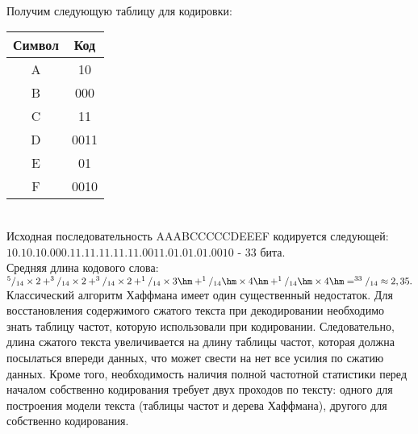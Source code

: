 \\
\\
\\Получим следующую таблицу для кодировки:
\begin{table}[h]
\begin{tabular}{|c|c|}
\hline
Символ &  Код \\
\hline
A & 10 \\
B & 000 \\
C & 11 \\
D & 0011 \\
E & 01 \\
F & 0010 \\
\hline
\end{tabular}
\end{table}
\\Исходная последовательность AAABCCCCCDEEEF кодируется следующей: $10.10.10.000.11.11.11.11.11.0011.01.01.01.0010$ - 33 бита.
\\Средняя длина кодового слова: $^5/_{14}\times 2 + ^3/_{14}\times 2 + ^3/_{14}\times 2 + ^1/_{14}\times 3\hm + ^1/_{14}\hm\times 4\hm + ^1/_{14}\hm\times 4\hm = ^{33}/_{14} \approx 2,35.$
Классический алгоритм Хаффмана имеет один существенный недостаток. Для восстановления содержимого сжатого текста при декодировании необходимо знать таблицу частот, которую использовали при кодировании. Следовательно, длина сжатого текста увеличивается на длину таблицы частот, которая должна посылаться впереди данных, что может свести на нет все усилия по сжатию данных. Кроме того, необходимость наличия полной частотной статистики перед началом собственно кодирования требует двух проходов по тексту: одного для построения модели текста (таблицы частот и дерева Хаффмана), другого для собственно кодирования.\\

